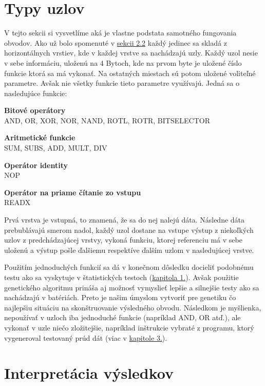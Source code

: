 \section{Typy uzlov}
\label{sec:nodes}

V tejto sekcii si vysvetlíme aká je vlastne podstata samotného fungovania obvodov. Ako už bolo spomenuté v \hyperref[sec:genetics]{sekcii 2.2} každý jedinec sa skladá z horizontálnych vrstiev, kde v každej vrstve sa nachádzajú uzly. Každý uzol nesie v sebe informáciu, uloženú na 4 Bytoch, kde na prvom byte je uložené číslo funkcie ktorá sa má vykonať. Na ostatných miestach sú potom uložené voliteľné parametre. Avšak nie všetky funkcie tieto parametre využívajú. Jedná sa o nasledujúce funkcie:

\begin{myItemize}
	\item \textbf{Bitové operátory}\\AND, OR, XOR, NOR, NAND, ROTL, ROTR, BITSELECTOR
	\item \textbf{Aritmetické funkcie}\\SUM, SUBS, ADD, MULT, DIV
	\item \textbf{Operátor identity}\\NOP
	\item \textbf{Operátor na priame čítanie zo vstupu}\\READX
\end{myItemize}
Prvá vrstva je vstupná, to znamená, že sa do nej nalejú dáta. Následne dáta prebublávajú smerom nadol, každý uzol dostane na vstupe výstup z niekoľkých uzlov z predchádzajúcej vrstvy, vykoná funkciu, ktorej referenciu má v sebe uloženú a výstup pošle ďalšiemu respektíve ďalším uzlom v nasledujúcej vrstve. 

Použitím jednoduchých funkcií sa dá v konečnom dôsledku docieliť podobnému testu ako sa vyskytuje v štatistických testoch (\hyperref[chap:statistic-tests]{kapitola 1.}). Avšak použitie genetického algoritmu prináša aj možnosť vymyslieť lepšie a silnejšie testy ako sa nachádzajú v batériách. Preto je našim úmyslom vytvoriť pre genetiku čo najlepšiu situáciu na skonštruovanie výsledného obvodu. Následkom je myšlienka, nepoužívať v uzloch iba jednoduché funkcie (napríklad AND, OR atď.), ale vykonať v uzle niečo zložitejšie, napríklad inštrukcie vybraté z programu, ktorý vygeneroval testovaný prúd dát (viac v \hyperref[chap:eacirc-jvmsim]{kapitole 3.}).

\section{Interpretácia výsledkov}
\label{sec:result-interpretation}

